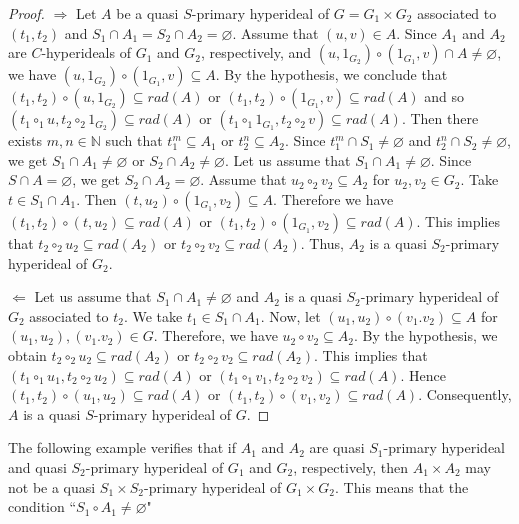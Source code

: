 \documentclass[preprint,review,10pt]{amsart}
\theoremstyle{definition}
\theoremstyle{remark}
\numberwithin{equation}{section}
\begin{document}
\begin{proof}
$ \Longrightarrow $ Let $A$ be a quasi $S$-primary hyperideal of $G=G_1 \times G_2$ associated to $(t_1,t_2)$ and $S_1 \cap A_1=S_2 \cap A_2= \varnothing$. Assume that $(u,v) \in A$. Since   $A_1$ and $A_2$ are $C$-hyperideals of $G_1$ and $G_2$, respectively, and $(u,1_{G_2}) \circ (1_{G_1},v) \cap A \neq \varnothing$, we have $(u,1_{G_2}) \circ (1_{G_1},v) \subseteq A$. By the hypothesis, we conclude that $  (t_1,t_2) \circ (u,1_{G_2}) \subseteq rad(A)$ or $  (t_1,t_2) \circ (1_{G_1},v) \subseteq rad(A)$ and so $(t_1 \circ_1 u, t_2 \circ_2 1_{G_2})   \subseteq rad(A)$ or $(t_1 \circ_1 1_{G_1}, t_2 \circ_2 v)  \subseteq rad(A)$. Then there exists $m,n \in \mathbb{N}$ such that $t_1^m \subseteq A_1$ or $t_2^n \subseteq A_2$. Since $t_1^m \cap S_1 \neq \varnothing$ and $t_2^n \cap S_2 \neq \varnothing$, we get $S_1 \cap A_1 \neq \varnothing$ or $S_2 \cap A_2 \neq \varnothing$. Let us assume that $S_1 \cap A_1 \neq \varnothing$. Since $S \cap A =\varnothing$, we get $S_2 \cap A_2 =\varnothing$. Assume that $u_2 \circ_2 v_2 \subseteq A_2$ for $u_2,v_2 \in G_2$. Take $t \in S_1 \cap A_1$. Then $(t,u_2) \circ (1_{G_1},v_2) \subseteq A$. Therefore we have $(t_1,t_2) \circ (t,u_2) \subseteq rad(A)$ or $(t_1,t_2) \circ (1_{G_1},v_2) \subseteq rad(A)$. This implies that $t_2 \circ_2 u_2 \subseteq  rad(A_2)$ or $t_2 \circ_2 v_2 \subseteq  rad(A_2)$. Thus, $A_2$ is a quasi $S_2$-primary hyperideal of $G_2$.

$ \Longleftarrow $  Let us assume that $S_1 \cap A_1 \neq \varnothing$ and $A_2$ is a quasi $S_2$-primary hyperideal of $G_2$ associated to $t_2$. We take $t_1 \in S_1 \cap A_1$. Now, let $(u_1,u_2)  \circ (v_1.v_2) \subseteq A$ for $(u_1,u_2) ,  (v_1.v_2) \in G$. Therefore, we have $u_2 \circ v_2 \subseteq A_2$. By the hypothesis, we obtain $t_2 \circ_2 u_2 \subseteq rad(A_2)$ or $t_2 \circ_2 v_2 \subseteq rad(A_2)$. This implies that $(t_1 \circ_1 u_1,t_2 \circ_2 u_2) \subseteq rad(A)$ or $(t_1 \circ_1 v_1,t_2 \circ_2 v_2) \subseteq rad(A)$. Hence $(t_1,t_2) \circ (u_1,u_2) \subseteq rad(A)$ or $(t_1,t_2) \circ (v_1,v_2) \subseteq rad(A)$. Consequently, $A$ is a quasi $S$-primary hyperideal of $G$.
\end{proof}
The following example verifies that if $A_1$ and $A_2$ are quasi $S_1$-primary hyperideal and quasi $S_2$-primary hyperideal of $G_1 $ and $ G_2$, respectively, then $A_1 \times A_2$ may not be a quasi $S_1 \times S_2$-primary hyperideal of $G_1 \times G_2$. This means that the condition ``$S_1 \circ A_1 \neq \varnothing$" 
\end{document}
